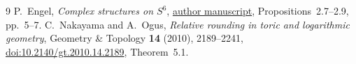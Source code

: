 \begin{thebibliography}{9}
P.~Engel, \emph{Complex structures on $S^6$},
\href{https://philip-engel.github.io/S6.pdf}{author manuscript},
Propositions~2.7--2.9, pp.~5--7.
C.~Nakayama and A.~Ogus,
\emph{Relative rounding in toric and logarithmic geometry},
Geometry \& Topology \textbf{14} (2010), 2189--2241,
\href{https://doi.org/10.2140/gt.2010.14.2189}{doi:10.2140/gt.2010.14.2189},
Theorem~5.1.
\end{thebibliography}
